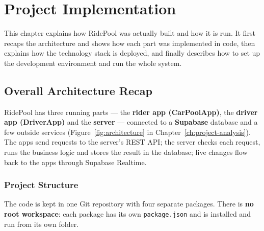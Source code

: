 \chapter{Project Implementation}
\label{ch:implementation}

This chapter explains how RidePool was actually built and how it is run. It
first recaps the architecture and shows how each part was implemented in code,
then explains how the technology stack is deployed, and finally describes how
to set up the development environment and run the whole system.

\section{Overall Architecture Recap}
\label{sec:arch-recap}

RidePool has three running parts --- the \textbf{rider app (CarPoolApp)}, the
\textbf{driver app (DriverApp)} and the \textbf{server} --- connected to a
\textbf{Supabase} database and a few outside services
(Figure~\ref{fig:architecture} in Chapter~\ref{ch:project-analysis}). The apps
send requests to the server's REST API; the server checks each request, runs
the business logic and stores the result in the database; live changes flow
back to the apps through Supabase Realtime.

\subsection{Project Structure}
\label{subsec:structure}

The code is kept in one Git repository with four separate packages. There is
\textbf{no root workspace}: each package has its own \texttt{package.json} and
is installed and run from its own folder.

